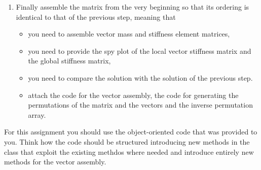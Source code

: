 \documentclass[unicode,11pt,a4paper,oneside,numbers=endperiod,openany]{scrartcl}
\begin{document}
\begin{enumerate}
\item Finally assemble the matrix from the very beginning so that its ordering
is identical to that of the previous step, meaning that
\begin{itemize}
\item you need to assemble vector mass and stiffness element matrices, 
\item you need to provide the spy plot of the local vector stiffness matrix and the global stiffness matrix,
\item you need to compare the solution with the solution of the previous step. 
\item attach the code for the vector assembly, the code for generating the permutations 
of the matrix and the vectors and the inverse permutation array. 
\end{itemize}

\end{enumerate}
For this assignment you should use the object-oriented code that was provided to you. Think how the code should be structured introducing new methods in the class that exploit the existing methdos where needed and introduce entirely new methods for the vector assembly. 
\end{document}
